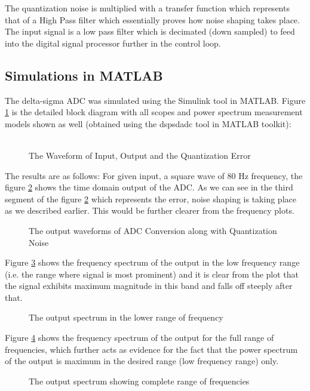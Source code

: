 \documentclass[colorlinks=true,pdfstartview=FitV,linkcolor=blue,
            citecolor=red,urlcolor=magenta]{ligodoc}
\begin{document}
The quantization noise is multiplied with a transfer function which represents that of a High Pass filter which essentially proves how noise shaping takes place. The input signal is a low pass filter which is decimated (down sampled) to feed into the digital signal processor further in the control loop.

\subsection{Simulations in MATLAB}
The delta-sigma ADC was simulated using the Simulink tool in MATLAB.
Figure \ref{simulink} is the detailed block diagram with all scopes and power spectrum measurement models shown as well (obtained using the dspsdadc tool in MATLAB toolkit): \\ \\
\begin{figure}[htbp]
 
  \centering
  
  \caption{The Waveform of Input, Output and the Quantization Error}
\label{simulink}
\end{figure}
The results are as follows:
For given input, a square wave of 80 Hz frequency, the figure \ref{time} shows the time domain output of the ADC. As we can see in the third segment of the figure \ref{time} which represents the error, noise shaping is taking place as we described earlier. This would be further clearer from the frequency plots.
\begin{figure}[htbp]
 
  \centering
  
  \caption{The output waveforms of ADC Conversion along with Quantization Noise}
 \label{time}
\end{figure}
Figure \ref{out1} shows the frequency spectrum of the output in the low frequency range (i.e. the range where signal is most prominent) and it is clear from the plot that the signal exhibits maximum magnitude in this band and falls off steeply after that.
\begin{figure}[htbp]
 
  \centering
  
  \caption{The output spectrum in the lower range of frequency}
 \label{out1}
\end{figure}
Figure \ref{out2} shows the frequency spectrum of the output for the full range of frequencies, which further acts as evidence for the fact that the power spectrum of the output is maximum in the desired range (low frequency range) only.
\begin{figure}[htbp]
 
  \centering
  
  \caption{The output spectrum showing complete range of frequencies}
 \label{out2}
\end{figure}
\end{document}
